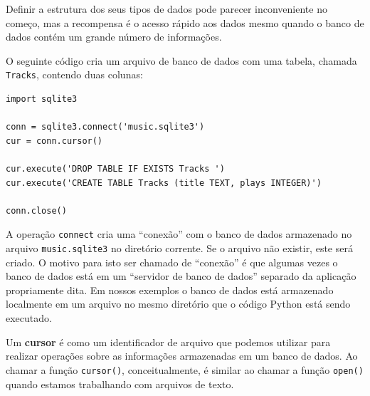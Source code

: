 Definir a estrutura dos seus tipos de dados pode parecer inconveniente no
começo, mas a recompensa é o acesso rápido aos dados mesmo quando o banco
de dados contém um grande número de informações.


O seguinte código cria um arquivo de banco de dados com uma tabela, chamada
{\tt Tracks}, contendo duas colunas:

\beforeverb
\begin{verbatim}
import sqlite3

conn = sqlite3.connect('music.sqlite3')
cur = conn.cursor()

cur.execute('DROP TABLE IF EXISTS Tracks ')
cur.execute('CREATE TABLE Tracks (title TEXT, plays INTEGER)')

conn.close()
\end{verbatim}
\afterverb
%

A operação {\tt connect} cria uma ``conexão'' com o banco de dados armazenado
no arquivo {\tt music.sqlite3} no diretório corrente. Se o arquivo não
existir, este será criado. O motivo para isto ser chamado de ``conexão'' é
que algumas vezes o banco de dados está  em um ``servidor de banco de dados'' 
separado da aplicação propriamente dita. Em nossos exemplos o banco de dados
está armazenado localmente em um arquivo no mesmo diretório que o código
Python está sendo executado.



Um {\bf cursor} é como um identificador de arquivo que podemos utilizar para
realizar operações sobre as informações armazenadas em um banco de dados. Ao
chamar a função {\tt cursor()}, conceitualmente, é similar ao chamar a função
{\tt open()} quando estamos trabalhando com arquivos de texto.

